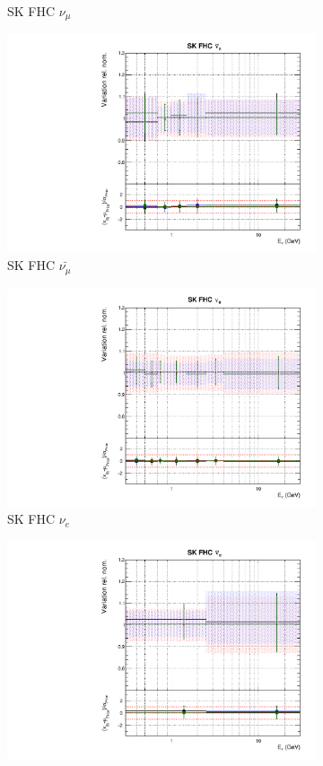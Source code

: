 \begin{figure}
\begin{subfigure}{0.45\textwidth}
  \caption{SK FHC $\nu_{\mu}$}
\end{subfigure}
\begin{subfigure}{0.45\textwidth}
  \centering
  \includegraphics[width=0.75\linewidth]{figs/hptpcfitsflux_9}
  \caption{SK FHC $\bar{\nu_{\mu}}$}
\end{subfigure}
\begin{subfigure}{0.45\textwidth}
  \centering
  \includegraphics[width=0.75\linewidth]{figs/hptpcfitsflux_10}
  \caption{SK FHC $\nu_e$}
\end{subfigure}
\begin{subfigure}{0.45\textwidth}
  \centering
  \includegraphics[width=0.75\linewidth]{figs/hptpcfitsflux_11}

\end{subfigure}
\end{figure}
